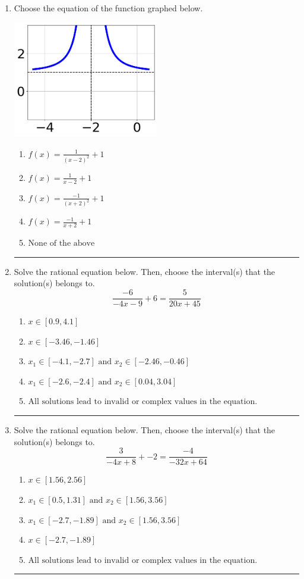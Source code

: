 \documentclass[14pt]{extbook}
\newcommand{\litem}[1]{\item#1\hspace*{-1cm}\rule{\textwidth}{0.4pt}}
\begin{document}
\begin{enumerate}
{\begin{enumerate}[label=\Alph*.]
\end{enumerate} }
\litem{
Choose the equation of the function graphed below.
\begin{center}
    \includegraphics[width=0.5\textwidth]{../Figures/rationalGraphToEquationA.png}
\end{center}
\begin{enumerate}[label=\Alph*.]
\item \( f(x) = \frac{1}{(x - 2)^2} + 1 \)
\item \( f(x) = \frac{1}{x - 2} + 1 \)
\item \( f(x) = \frac{-1}{(x + 2)^2} + 1 \)
\item \( f(x) = \frac{-1}{x + 2} + 1 \)
\item \( \text{None of the above} \)

\end{enumerate} }
\litem{
Solve the rational equation below. Then, choose the interval(s) that the solution(s) belongs to.\[ \frac{-6}{-4x -9} + 6 = \frac{5}{20x + 45} \]\begin{enumerate}[label=\Alph*.]
\item \( x \in [0.9,4.1] \)
\item \( x \in [-3.46,-1.46] \)
\item \( x_1 \in [-4.1, -2.7] \text{ and } x_2 \in [-2.46,-0.46] \)
\item \( x_1 \in [-2.6, -2.4] \text{ and } x_2 \in [0.04,3.04] \)
\item \( \text{All solutions lead to invalid or complex values in the equation.} \)

\end{enumerate} }
\litem{
Solve the rational equation below. Then, choose the interval(s) that the solution(s) belongs to.\[ \frac{3}{-4x + 8} + -2 = \frac{-4}{-32x + 64} \]\begin{enumerate}[label=\Alph*.]
\item \( x \in [1.56,2.56] \)
\item \( x_1 \in [0.5, 1.31] \text{ and } x_2 \in [1.56,3.56] \)
\item \( x_1 \in [-2.7, -1.89] \text{ and } x_2 \in [1.56,3.56] \)
\item \( x \in [-2.7,-1.89] \)
\item \( \text{All solutions lead to invalid or complex values in the equation.} \)

\end{enumerate} }
\end{enumerate}
\end{document}
